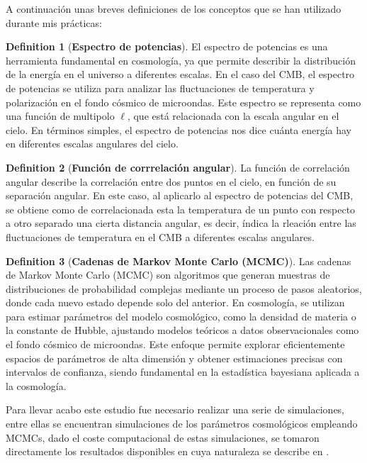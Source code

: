 \documentclass[12pt, a4paper]{article}
\theoremstyle{definition}
\newtheorem{definition}{Definition}[section]
\begin{document}
A continuación unas breves definiciones de los conceptos que se han utilizado durante mis prácticas:

\begin{definition}[\textbf{Espectro de potencias}]
  El espectro de potencias es una herramienta fundamental en cosmología, ya que permite describir la distribución de la energía en el universo a diferentes escalas. En el caso del CMB, el espectro de potencias se utiliza para analizar las fluctuaciones de temperatura y polarización en el fondo cósmico de microondas. Este espectro se representa como una función de multipolo $\ell$, que está relacionada con la escala angular en el cielo. En términos simples, el espectro de potencias nos dice cuánta energía hay en diferentes escalas angulares del cielo.
\end{definition}
\begin{definition}[\textbf{Función de corrrelación angular}]
  La función de correlación angular  describe la correlación entre dos puntos en el cielo, en función de su separación angular. En este caso, al aplicarlo al espectro de potencias del CMB, se obtiene como de correlacionada esta la temperatura de un punto con respecto a otro separado una cierta distancia angular, es decir, índica la rleación entre las fluctuaciones de temperatura en el CMB a diferentes escalas angulares.
\end{definition}
\begin{definition}[\textbf{Cadenas de Markov Monte Carlo (MCMC)}]
  Las cadenas de Markov Monte Carlo (MCMC) son algoritmos que generan muestras de distribuciones de probabilidad complejas mediante un proceso de pasos aleatorios, donde cada nuevo estado depende solo del anterior. En cosmología, se utilizan para estimar parámetros del modelo cosmológico, como la densidad de materia o la constante de Hubble, ajustando modelos teóricos a datos observacionales como el fondo cósmico de microondas. Este enfoque permite explorar eficientemente espacios de parámetros de alta dimensión y obtener estimaciones precisas con intervalos de confianza, siendo fundamental en la estadística bayesiana aplicada a la cosmología.
\end{definition}



Para llevar acabo este estudio fue necesario realizar una serie de simulaciones, entre ellas se encuentran simulaciones de los parámetros cosmológicos empleando MCMCs, dado el coste computacional de estas simulaciones, se tomaron directamente los resultados disponibles en \autocite{planck_legacy_archive} cuya naturaleza se describe en \autocite{cosmoplanck_2020}.
\end{document}
